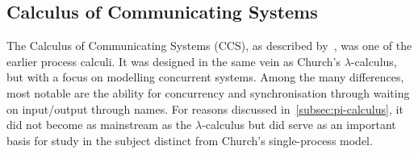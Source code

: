 \subsection{Calculus of Communicating Systems}

    The Calculus of Communicating Systems (CCS), as described by~\cite{ccs-syntax}, was one of the earlier\footnotemark{} process calculi.
    It was designed in the same vein as Church's $\lambda$-calculus, but with a focus on modelling concurrent systems.
    Among the many differences, most notable are the ability for concurrency and synchronisation through waiting on input/output through names.
    For reasons discussed in~\ref{subsec:pi-calculus}, it did not become as mainstream as the $\lambda$-calculus but did serve as an important basis for study in the subject distinct from Church's single-process model.



